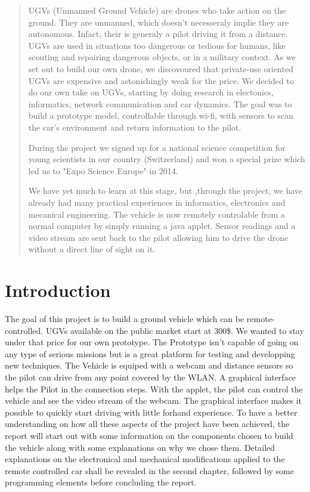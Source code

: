 \documentclass[a4paper,11pt]{report}
\begin{document}
{\clearpage

\begin{abstract}
 UGVs (Unmanned Ground Vehicle) are drones who take action on the ground. They
 are unmanned, which doesn't necesseraly implie they are autonomous. Infact,
 their is generaly a pilot driving it from a distance. UGVs are used in
 situations too dangerous or tedious for humans, like scouting and repairing
 dangerous objects, or in a military context. As we set out to build our own
 drone, we discovoured that private-use oriented UGVs are expensive and
 astonishingly weak for the price. We decided to do our own take on
 UGVs, starting by doing research in electonics, informatics, network
 communication and car dynamics. The goal was to build a prototype model,
 controllable through wi-fi, with sensors to scan the car's environment and
 return information to the pilot.

During the project we signed up for a national science competition for young
scientists in our country (Switzerland) and won a special prize which led us
to "Expo Science Europe" in 2014.

We have yet much to learn at this stage, but ,through the project, we have
already had many 
practical experiences in informatics, electronics and mecanical
engineering. The vehicle is now remotely controlable from a normal computer by
simply running a java applet. Sensor readings and a video stream are sent back
to the pilot allowing him to drive the drone without a direct line of sight on
it.
     
\setcounter{page}{3}
\end{abstract}
\clearpage
{}
\tableofcontents
\clearpage
\listoffigures
\listoftables 
\clearpage

\section*{Introduction}

The goal of this project is to build a ground vehicle which can be
remote-controlled. UGVs available on the public market start at 300\$. We
wanted to 
stay under that price for our own prototype. The Prototype isn't capable of
going on any type of serious missions but is a great platform for testing and
developping new techniques. The Vehicle is equiped with a
webcam and distance sensors so the pilot can drive from any point covered
by the WLAN. A graphical interface helps the Pilot in the connection
steps. With the applet, the pilot can control the vehicle and see the video
stream of the webcam. The graphical interface makes it possible to quickly
start driving with little forhand experience.
To have a better understanding on how all these aspects of the project have
been achieved, the report will start out with some information on the
components chosen to build the vehicle along with some explanations on why we
chose them. Detailed explanations on the electronical and mechanical
modifications applied to the remote controlled car shall be revealed in the
second chapter, followed by some programming elements before concluding the report.
\clearpage


}
\end{document}
